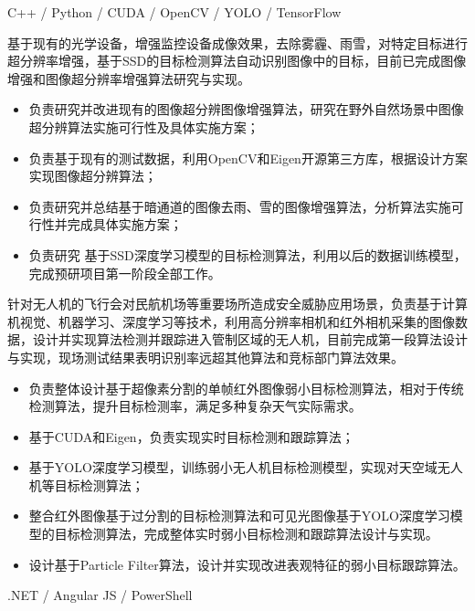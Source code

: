 \documentclass{resume}
\begin{document}
C++ / Python / CUDA / OpenCV / YOLO / TensorFlow


基于现有的光学设备，增强监控设备成像效果，去除雾霾、雨雪，对特定目标进行超分辨率增强，基于SSD的目标检测算法自动识别图像中的目标，目前已完成图像增强和图像超分辨率增强算法研究与实现。
\begin{itemize}
  \item 负责研究并改进现有的图像超分辨图像增强算法，研究在野外自然场景中图像超分辨算法实施可行性及具体实施方案；
  \item 负责基于现有的测试数据，利用OpenCV和Eigen开源第三方库，根据设计方案实现图像超分辨算法；
  \item 负责研究并总结基于暗通道的图像去雨、雪的图像增强算法，分析算法实施可行性并完成具体实施方案；
  \item 负责研究 基于SSD深度学习模型的目标检测算法，利用以后的数据训练模型，完成预研项目第一阶段全部工作。
\end{itemize}



针对无人机的飞行会对民航机场等重要场所造成安全威胁应用场景，负责基于计算机视觉、机器学习、深度学习等技术，利用高分辨率相机和红外相机采集的图像数据，设计并实现算法检测并跟踪进入管制区域的无人机，目前完成第一段算法设计与实现，现场测试结果表明识别率远超其他算法和竞标部门算法效果。
\begin{itemize}
  \item 负责整体设计基于超像素分割的单帧红外图像弱小目标检测算法，相对于传统检测算法，提升目标检测率，满足多种复杂天气实际需求。
  \item 基于CUDA和Eigen，负责实现实时目标检测和跟踪算法；
  \item 基于YOLO深度学习模型，训练弱小无人机目标检测模型，实现对天空域无人机等目标检测算法；
  \item 整合红外图像基于过分割的目标检测算法和可见光图像基于YOLO深度学习模型的目标检测算法，完成整体实时弱小目标检测和跟踪算法设计与实现。
  \item 设计基于Particle Filter算法，设计并实现改进表观特征的弱小目标跟踪算法。
\end{itemize}

.NET / Angular JS / PowerShell
\end{document}
